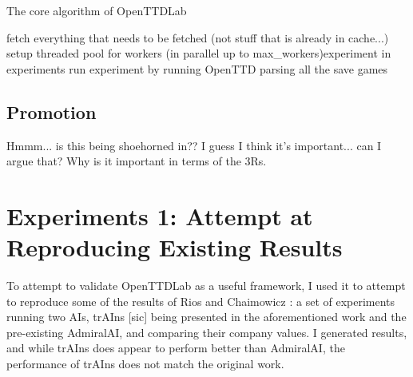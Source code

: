 \documentclass[logo,msc,dsti]{style/infthesis}    %
\begin{document}
{\begin{algorithm}
\caption{The core algorithm of OpenTTDLab}\label{alg:openttd}
 fetch everything that needs to be fetched (not stuff that is already in cache...)\;
 setup threaded pool for workers\;
 \ForEach(in parallel up to {max\_workers}){experiment in experiments}{
  run experiment by running OpenTTD\;
  parsing all the save games\;
 }
\end{algorithm}


\section{Promotion}

Hmmm... is this being shoehorned in?? I guess I think it's important... can I argue that? Why is it important in terms of the 3Rs.





\chapter{Experiments 1: Attempt at Reproducing Existing Results}
\label{chapter:experiments-attempt-at-reproducing}

To attempt to validate OpenTTDLab as a useful framework, I used it to attempt to reproduce some of the results of Rios and Chaimowicz \cite{rios2009trains}: a set of experiments running two AIs, trAIns [sic] being presented in the aforementioned work and the pre-existing AdmiralAI, and comparing their company values. I generated results, and while trAIns does appear to perform better than AdmiralAI, the performance of trAIns does not match the original work.

}
\end{document}
